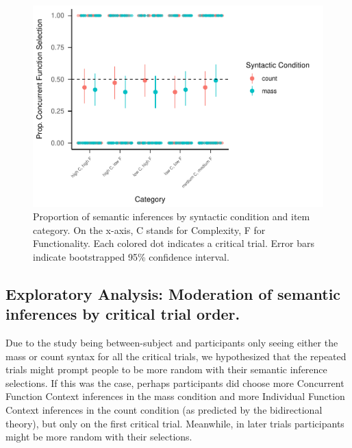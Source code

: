 \documentclass[
  man,floatsintext]{apa6}
\begin{document}
\begin{figure}
\centering
\includegraphics{3_writeup_files/figure-latex/unnamed-chunk-3-1.pdf}
\caption{\label{fig:unnamed-chunk-3}Proportion of semantic inferences by syntactic condition and item category. On the x-axis, C stands for Complexity, F for Functionality. Each colored dot indicates a critical trial. Error bars indicate bootstrapped 95\% confidence interval.}
\end{figure}

\hypertarget{exploratory-analysis-moderation-of-semantic-inferences-by-critical-trial-order.}{%
\subsection{Exploratory Analysis: Moderation of semantic inferences by critical trial order.}\label{exploratory-analysis-moderation-of-semantic-inferences-by-critical-trial-order.}}

Due to the study being between-subject and participants only seeing either the mass or count syntax for all the critical trials, we hypothesized that the repeated trials might prompt people to be more random with their semantic inference selections. If this was the case, perhaps participants did choose more Concurrent Function Context inferences in the mass condition and more Individual Function Context inferences in the count condition (as predicted by the bidirectional theory), but only on the first critical trial. Meanwhile, in later trials participants might be more random with their selections.
\end{document}
